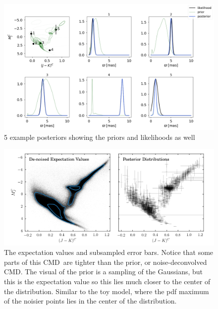 \documentclass[modern]{aastex61}
\newcommand{\acronym}[1]{{\small{#1}}}
\newcommand{\cmd}{\acronym{CMD}}
\begin{document}
\begin{figure}
\centering
  \includegraphics[width=\textwidth]{posterior.png}
\caption{5 example posteriors showing the priors and likelihoods as well}
\label{fig:posterior}
\end{figure}


\begin{figure}
\centering
  \includegraphics[width=\textwidth]{posteriorCMD.png}
\caption{The expectation values and subsampled error bars. Notice that some parts of this \cmd\ are tighter than the prior, or noise-deconvolved \cmd. The visual of the prior is a sampling of the Gaussians, but this is the expectation value so this lies much closer to the center of the distribution. Similar to the toy model, where the pdf maximum of the noisier points lies in the center of the distribution.}
\label{fig:posteriorCMD}
\end{figure}
\end{document}
